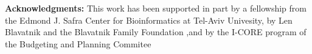 \textbf{Acknowledgments:}  This work has been supported in part by a fellowship from the Edmond J. Safra Center for Bioinformatics at Tel-Aviv Univesity, by Len Blavatnik and the Blavatnik Family Foundation ,and  by the I-CORE program of the Budgeting and Planning Commitee
